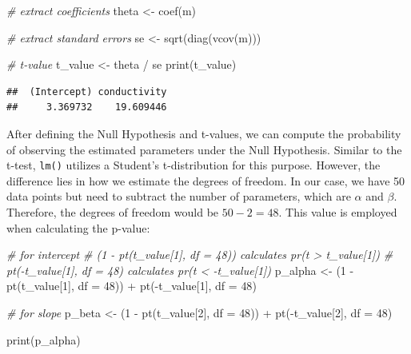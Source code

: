\documentclass[
]{book}
\newenvironment{Shaded}{\begin{snugshade}}{\end{snugshade}}
\newcommand{\AttributeTok}[1]{\textcolor[rgb]{0.77,0.63,0.00}{#1}}
\newcommand{\CommentTok}[1]{\textcolor[rgb]{0.56,0.35,0.01}{\textit{#1}}}
\newcommand{\DecValTok}[1]{\textcolor[rgb]{0.00,0.00,0.81}{#1}}
\newcommand{\FunctionTok}[1]{\textcolor[rgb]{0.00,0.00,0.00}{#1}}
\newcommand{\NormalTok}[1]{#1}
\newcommand{\OtherTok}[1]{\textcolor[rgb]{0.56,0.35,0.01}{#1}}
\newcommand{\SpecialCharTok}[1]{\textcolor[rgb]{0.00,0.00,0.00}{#1}}
\begin{document}
\begin{Shaded}
\begin{Highlighting}[]
\CommentTok{\# extract coefficients}
\NormalTok{theta }\OtherTok{\textless{}{-}} \FunctionTok{coef}\NormalTok{(m)}

\CommentTok{\# extract standard errors}
\NormalTok{se }\OtherTok{\textless{}{-}} \FunctionTok{sqrt}\NormalTok{(}\FunctionTok{diag}\NormalTok{(}\FunctionTok{vcov}\NormalTok{(m)))}

\CommentTok{\# t{-}value}
\NormalTok{t\_value }\OtherTok{\textless{}{-}}\NormalTok{ theta }\SpecialCharTok{/}\NormalTok{ se}
\FunctionTok{print}\NormalTok{(t\_value)}
\end{Highlighting}
\end{Shaded}

\begin{verbatim}
##  (Intercept) conductivity 
##     3.369732    19.609446
\end{verbatim}

After defining the Null Hypothesis and t-values, we can compute the probability of observing the estimated parameters under the Null Hypothesis. Similar to the t-test, \texttt{lm()} utilizes a Student's t-distribution for this purpose. However, the difference lies in how we estimate the degrees of freedom. In our case, we have 50 data points but need to subtract the number of parameters, which are \(\alpha\) and \(\beta\). Therefore, the degrees of freedom would be \(50 - 2 = 48\). This value is employed when calculating the p-value:

\begin{Shaded}
\begin{Highlighting}[]
\CommentTok{\# for intercept}
\CommentTok{\# (1 {-} pt(t\_value[1], df = 48)) calculates pr(t \textgreater{} t\_value[1])}
\CommentTok{\# pt({-}t\_value[1], df = 48) calculates pr(t \textless{} {-}t\_value[1])}
\NormalTok{p\_alpha }\OtherTok{\textless{}{-}}\NormalTok{ (}\DecValTok{1} \SpecialCharTok{{-}} \FunctionTok{pt}\NormalTok{(t\_value[}\DecValTok{1}\NormalTok{], }\AttributeTok{df =} \DecValTok{48}\NormalTok{)) }\SpecialCharTok{+} \FunctionTok{pt}\NormalTok{(}\SpecialCharTok{{-}}\NormalTok{t\_value[}\DecValTok{1}\NormalTok{], }\AttributeTok{df =} \DecValTok{48}\NormalTok{)}

\CommentTok{\# for slope}
\NormalTok{p\_beta }\OtherTok{\textless{}{-}}\NormalTok{ (}\DecValTok{1} \SpecialCharTok{{-}} \FunctionTok{pt}\NormalTok{(t\_value[}\DecValTok{2}\NormalTok{], }\AttributeTok{df =} \DecValTok{48}\NormalTok{)) }\SpecialCharTok{+} \FunctionTok{pt}\NormalTok{(}\SpecialCharTok{{-}}\NormalTok{t\_value[}\DecValTok{2}\NormalTok{], }\AttributeTok{df =} \DecValTok{48}\NormalTok{)}

\FunctionTok{print}\NormalTok{(p\_alpha)}
\end{Highlighting}
\end{Shaded}
\end{document}
